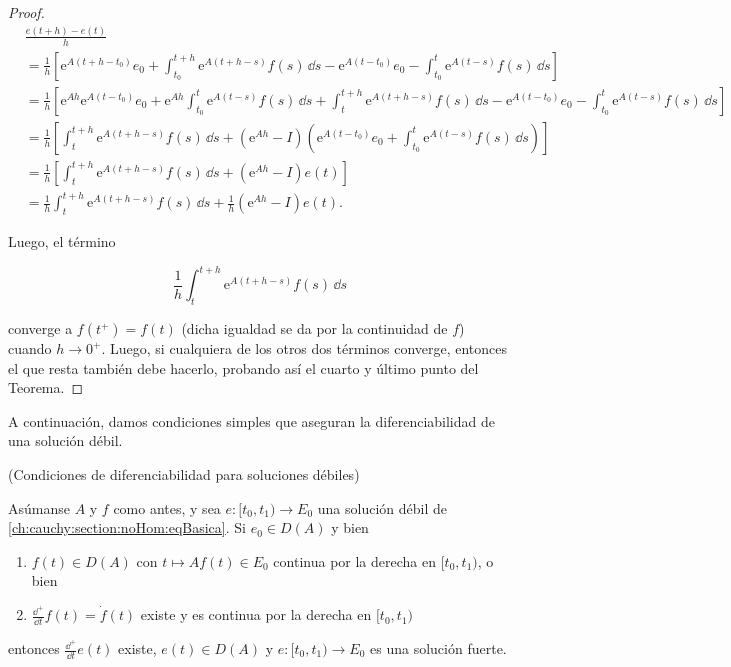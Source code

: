 \begin{proof}
    \begin{align*}
        &\frac{e(t+h) - e(t)}{h}\\
        &= \frac{1}{h} \left[ \mathrm{e}^{A(t+h-t_0)}e_0 + \int_{t_0}^{t+h}\mathrm{e}^{A(t+h-s)} f(s) \, \dd s - \mathrm{e}^{A(t-t_0)}e_0 - \int_{t_0}^{t}\mathrm{e}^{A(t-s)} f(s) \, \dd s \right]\\
        &= \frac{1}{h} \left[ \mathrm{e}^{Ah}\mathrm{e}^{A(t-t_0)}e_0 + \mathrm{e}^{Ah}\int_{t_0}^{t}\mathrm{e}^{A(t-s)} f(s) \, \dd s + \int_{t}^{t+h}\mathrm{e}^{A(t+h-s)} f(s) \, \dd s - \mathrm{e}^{A(t-t_0)}e_0 - \int_{t_0}^{t}\mathrm{e}^{A(t-s)} f(s) \, \dd s \right]\\
        &= \frac{1}{h}\left[\int_{t}^{t+h}\mathrm{e}^{A(t+h-s)} f(s) \, \dd s + (\mathrm{e}^{Ah} - I) \left( \mathrm{e}^{A(t-t_0)}e_0 + \int_{t_0}^{t}\mathrm{e}^{A(t-s)} f(s) \, \dd s \right) \right]\\
        &= \frac{1}{h} \left[\int_{t}^{t+h}\mathrm{e}^{A(t+h-s)} f(s) \, \dd s + (\mathrm{e}^{Ah} - I)e(t) \right]\\
        &= \frac{1}{h} \int_{t}^{t+h}\mathrm{e}^{A(t+h-s)} f(s) \, \dd s + \frac{1}{h}(\mathrm{e}^{Ah} - I)e(t).
    \end{align*}

    Luego, el término

    \[\frac{1}{h} \int_{t}^{t+h}\mathrm{e}^{A(t+h-s)} f(s) \, \dd s\]

    converge a $f(t^+) = f(t)$ (dicha igualdad se da por la continuidad de $f$) cuando $h \rightarrow 0^+$. Luego, si cualquiera de los otros dos términos converge, entonces el que resta también debe hacerlo, probando así el cuarto y último punto del Teorema.
\end{proof}

A continuación, damos condiciones simples que aseguran la diferenciabilidad de una solución débil.\\

\begin{Teorema}{(Condiciones de diferenciabilidad para soluciones débiles)}
    \label{ch:cauchy:section:noHom:th:conDiffSolDebil}

    Asúmanse $A$ y $f$ como antes, y sea $e : [t_0, t_1) \rightarrow E_0$ una solución débil de \eqref{ch:cauchy:section:noHom:eqBasica}. Si $e_0 \in D(A)$ y bien
    
    \begin{enumerate}
    \item $f(t) \in D(A)$ con $t \mapsto Af(t) \in E_0$ continua por la derecha en $[t_0, t_1)$, o bien

    \item $\displaystyle \frac{\dd^+}{\dd t}f(t) = \dot{f}(t)$ existe y es continua por la derecha en $[t_0, t_1)$
    \end{enumerate}

    entonces $\displaystyle \frac{\dd^+}{\dd t}e(t)$ existe, $e(t) \in D(A)$ y $e : [t_0, t_1) \rightarrow E_0$ es una solución fuerte.
\end{Teorema}

